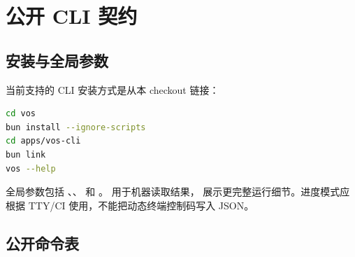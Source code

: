 \chapter{公开 CLI 契约}

\section{安装与全局参数}

当前支持的 CLI 安装方式是从本 checkout 链接：

\begin{lstlisting}[language=bash]
cd vos
bun install --ignore-scripts
cd apps/vos-cli
bun link
vos --help
\end{lstlisting}

全局参数包括 、、 和 。 用于机器读取结果， 展示更完整运行细节。进度模式应根据 TTY/CI 使用，不能把动态终端控制码写入 JSON。

\section{公开命令表}

